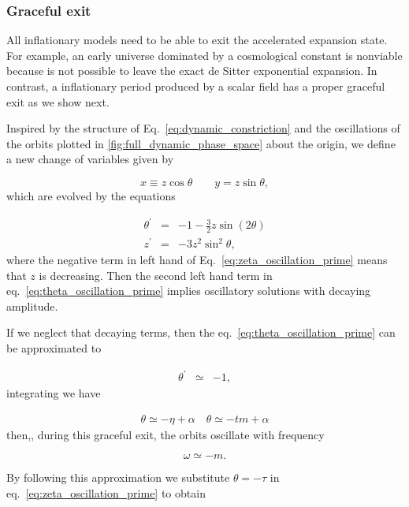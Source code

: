 \documentclass[12pt,letterpaper,twoside]{book}
\begin{document}
\subsubsection{Graceful exit}

 All inflationary models need to be able to exit the accelerated expansion
 state. For example, an early universe dominated by a
 cosmological constant is nonviable because is not possible to leave the exact
 de Sitter exponential expansion. In contrast, a inflationary period produced by
 a scalar field has a proper graceful exit as we show next.

Inspired by the structure of Eq.~\eqref{eq:dynamic_constriction} and the
oscillations of the orbits plotted in \ref{fig:full_dynamic_phase_space} about
the origin, we define a new change of variables given by

\begin{equation}
x\equiv z\cos \theta \qquad y=z\sin \theta,
\end{equation}
which are evolved by the equations

\begin{eqnarray}
    \label{eq:theta_oscillation_prime}
    \theta ^\prime &=& -1 -\frac{3}{2} z \sin (2\theta) \\
    \label{eq:zeta_oscillation_prime}
    z^\prime &=& -3z^2 \sin^2 \theta,
\end{eqnarray}
where the negative term in left hand of Eq.~\eqref{eq:zeta_oscillation_prime}
means that $z$ is decreasing. Then the second left hand term in
eq.~\eqref{eq:theta_oscillation_prime} implies oscillatory solutions with
decaying amplitude.

If we neglect that decaying terms, then the
eq.~\eqref{eq:theta_oscillation_prime} can be approximated to

\begin{eqnarray}
\theta ^\prime &  \simeq & -1,
\end{eqnarray}
integrating we have

\begin{eqnarray}
    \theta \simeq -\eta + \alpha   \quad \theta  \simeq -tm +\alpha
\end{eqnarray}
then,, during this graceful exit, the orbits oscillate  with frequency

\begin{equation}
\boxed{\omega  \simeq -m}.
\end{equation}

By following this approximation we substitute $\theta=-\tau$ in
eq.~\eqref{eq:zeta_oscillation_prime} to obtain
\end{document}

